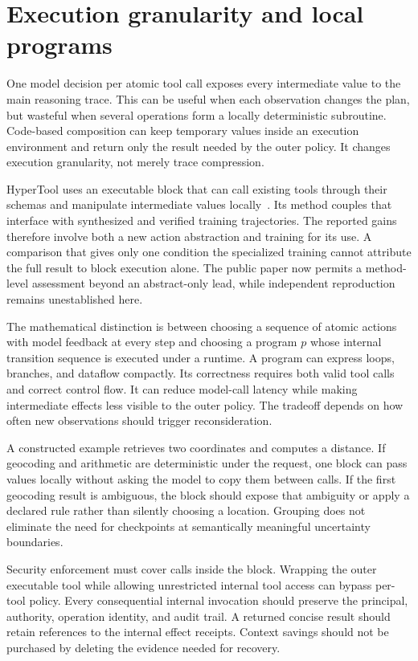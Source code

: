 \section{Execution granularity and local programs}\label{sec:C18:granularity}
One model decision per atomic tool call exposes every intermediate value to the main reasoning trace. This can be useful when each observation changes the plan, but wasteful when several operations form a locally deterministic subroutine. Code-based composition can keep temporary values inside an execution environment and return only the result needed by the outer policy. It changes execution granularity, not merely trace compression.

HyperTool uses an executable block that can call existing tools through their schemas and manipulate intermediate values locally~\cite{du2026hypertool}. Its method couples that interface with synthesized and verified training trajectories. The reported gains therefore involve both a new action abstraction and training for its use. A comparison that gives only one condition the specialized training cannot attribute the full result to block execution alone. The public paper now permits a method-level assessment beyond an abstract-only lead, while independent reproduction remains unestablished here.

The mathematical distinction is between choosing a sequence of atomic actions with model feedback at every step and choosing a program $p$ whose internal transition sequence is executed under a runtime. A program can express loops, branches, and dataflow compactly. Its correctness requires both valid tool calls and correct control flow. It can reduce model-call latency while making intermediate effects less visible to the outer policy. The tradeoff depends on how often new observations should trigger reconsideration.

A constructed example retrieves two coordinates and computes a distance. If geocoding and arithmetic are deterministic under the request, one block can pass values locally without asking the model to copy them between calls. If the first geocoding result is ambiguous, the block should expose that ambiguity or apply a declared rule rather than silently choosing a location. Grouping does not eliminate the need for checkpoints at semantically meaningful uncertainty boundaries.

Security enforcement must cover calls inside the block. Wrapping the outer executable tool while allowing unrestricted internal tool access can bypass per-tool policy. Every consequential internal invocation should preserve the principal, authority, operation identity, and audit trail. A returned concise result should retain references to the internal effect receipts. Context savings should not be purchased by deleting the evidence needed for recovery.

